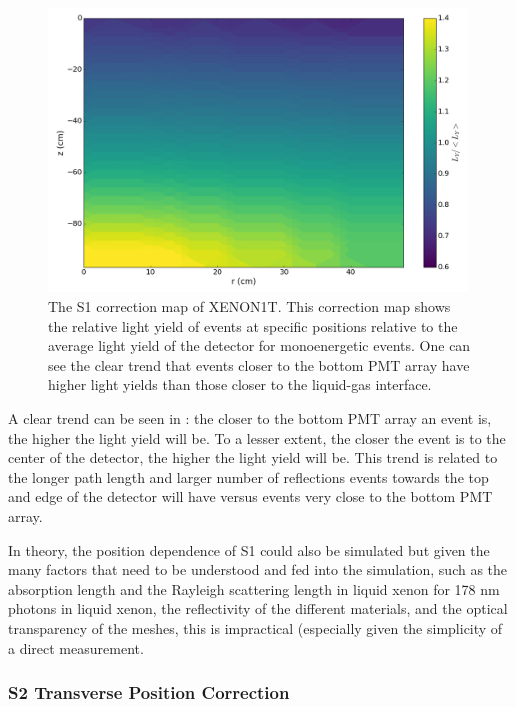 \begin{figure}[t]
	\centering
	\includegraphics[width=0.99\textwidth]{xe1t_s1_correction_map}
	\caption{The S1 correction map of XENON1T.  This correction map shows the relative light yield of events at specific positions relative to the average light yield of the detector for monoenergetic events.  One can see the clear trend that events closer to the bottom PMT array have higher light yields than those closer to the liquid-gas interface.}
	\label{fig:xe1t_s1_correction_map}
\end{figure}


A clear trend can be seen in : the closer to the bottom PMT array an event is, the higher the light yield will be.  To a lesser extent, the closer the event is to the center of the detector, the higher the light yield will be.  This trend is related to the longer path length and larger number of reflections events towards the top and edge of the detector will have versus events very close to the bottom PMT array.

In theory, the position dependence of S1 could also be simulated but given the many factors that need to be understood and fed into the simulation, such as the absorption length and the Rayleigh scattering length in liquid xenon for 178 nm photons in liquid xenon, the reflectivity of the different materials, and the optical transparency of the meshes, this is impractical (especially given the simplicity of a direct measurement.


\subsubsection{S2 Transverse Position Correction}


